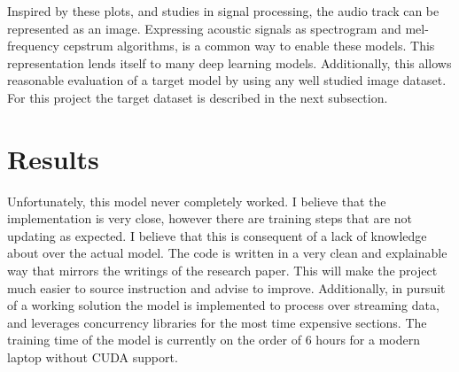 \documentclass{article}
\begin{document}
\begin{multicols}{2}

Inspired by these plots, and studies in signal processing, the audio track can be represented
as an image.  Expressing acoustic signals as spectrogram and mel-frequency cepstrum algorithms,
is a common way to enable these models. This representation lends itself to many deep learning
models. Additionally, this allows reasonable evaluation of a target model by using any well
studied image dataset. For this project the target dataset is described in the next subsection.


\section{Results}

Unfortunately, this model never completely worked. I believe that the implementation is very close,
however there are training steps that are not updating as expected. I believe that this is consequent
of a lack of knowledge about \pytorch over the actual model. The code is written in a very clean and
explainable way that mirrors the writings of the research paper. This will make the project
much easier to source instruction and advise to improve. Additionally, in pursuit of a working solution
the model is implemented to process over streaming data, and leverages concurrency libraries for the
most time expensive sections. The training time of the model is currently on the order of 6 hours
for a modern laptop without CUDA support.


\end{multicols}
\end{document}
